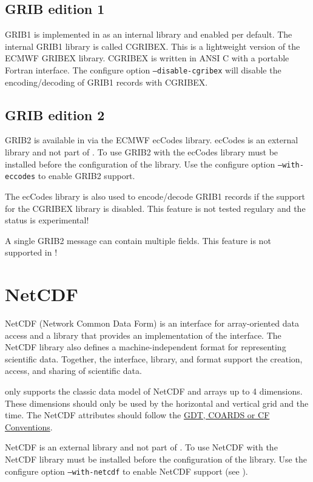 \subsection{GRIB edition 1}

GRIB1 is implemented in {\CDI} as an internal library and enabled per default.
The internal GRIB1 library is called CGRIBEX. This is a lightweight
version of the ECMWF GRIBEX library. CGRIBEX is written in ANSI C with a portable Fortran interface. 
The configure option \texttt{--disable-cgribex} will disable the encoding/decoding of GRIB1 records with CGRIBEX.

\subsection{GRIB edition 2}

GRIB2 is available in {\CDI} via the ECMWF ecCodes \cite{ecCodes} library.
ecCodes is an external library and not part of {\CDI}. To use GRIB2 with
{\CDI} the ecCodes library must be installed before the configuration
of the {\CDI} library. Use the configure option \texttt{--with-eccodes} to
enable GRIB2 support. 

The ecCodes library is also used to encode/decode GRIB1 records if the support for the CGRIBEX library is disabled.
This feature is not tested regulary and the status is experimental!

A single GRIB2 message can contain multiple fields. This feature is not supported in {\CDI}!

\section{NetCDF}

NetCDF \cite{NetCDF} (Network Common Data Form) is an interface for array-oriented data
access and a library that provides an implementation of the interface.
The NetCDF library also defines a machine-independent format for 
representing scientific data. Together, the interface, library, and 
format support the creation, access, and sharing of scientific data.

{\CDI} only supports the classic data model of NetCDF and arrays up to 4 dimensions.
These dimensions should only be used by the horizontal and vertical grid and the time.
The NetCDF attributes should follow the
\href{http://ftp.unidata.ucar.edu/software/netcdf/docs/conventions.html}
     {GDT, COARDS or CF Conventions}.

NetCDF is an external library and not part of {\CDI}. To use NetCDF with
{\CDI} the NetCDF library must be installed before the configuration
of the {\CDI} library. Use the configure option \texttt{--with-netcdf} to
enable NetCDF support (see ).

